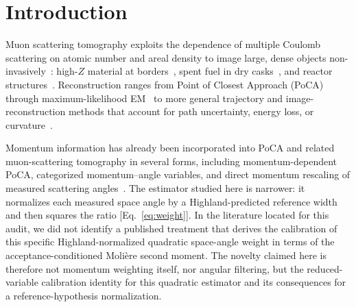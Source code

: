\documentclass[aps,pra,reprint,longbibliography,floatfix]{revtex4-2}
\begin{document}
\maketitle

\section{Introduction}
Muon scattering tomography exploits the dependence of multiple Coulomb scattering on atomic number and areal density to image large, dense objects non-invasively~\cite{miyadera2022}: high-$Z$ material at borders~\cite{schultz2004}, spent fuel in dry casks~\cite{bae2024,poulson2019}, and reactor structures~\cite{procureur2018}.  Reconstruction ranges from Point of Closest Approach (PoCA)~\cite{schultz2004} through maximum-likelihood EM~\cite{schultz2007} to more general trajectory and image-reconstruction methods that account for path uncertainty, energy loss, or curvature~\cite{chatzidakis2018,liu2019,ughade2025}.

Momentum information has already been incorporated into PoCA and related muon-scattering tomography in several forms, including momentum-dependent PoCA, categorized momentum--angle variables, and direct momentum rescaling of measured scattering angles~\cite{bae2022,bae2024ane,bae2024net,bae2024,yu2025}.  The estimator studied here is narrower: it normalizes each measured space angle by a Highland-predicted reference width and then squares the ratio [Eq.~\eqref{eq:weight}].  In the literature located for this audit, we did not identify a published treatment that derives the calibration of this specific Highland-normalized quadratic space-angle weight in terms of the acceptance-conditioned Moli\`ere second moment.  The novelty claimed here is therefore not momentum weighting itself, nor angular filtering, but the reduced-variable calibration identity for this quadratic estimator and its consequences for a reference-hypothesis normalization.
\end{document}
